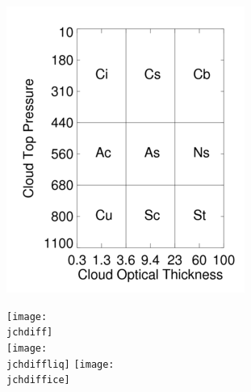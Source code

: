 


\begin{figure}[!ht]
  \begin{minipage}[c]{0.4\textwidth}
    \includegraphics[scale=0.50]{./figures/isccp_uebersicht.png} 
  \end{minipage}\hfill
  \begin{minipage}[c]{0.6\textwidth}
    \caption[ISCCP COT-CTP classification.]{\isccp}\label{fig:isccp}
  \end{minipage}
\end{figure}


\begin{figure}[!ht]
  \centering
  \texttt{[image: \\jchdiff]} \\
  \texttt{[image: \\jchdiffliq]}
  \texttt{[image: \\jchdiffice]} 
  \caption[Joint cloud proptery histograms (difference).]{\jchdiffcaption}\label{fig:jchdiff}
\end{figure}


